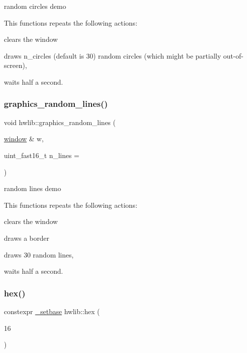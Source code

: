 random circles demo

This functions repeats the following actions\+:
\begin{DoxyItemize}
\item clears the window
\item draws n\+\_\+circles (default is 30) random circles (which might be partially out-\/of-\/screen),
\item waits half a second. 
\end{DoxyItemize}\mbox{\label{namespacehwlib_a6565c83ceab3983476ae71596ddb49a5}} 
\subsubsection{\texorpdfstring{graphics\+\_\+random\+\_\+lines()}{graphics\_random\_lines()}}
{\footnotesize\ttfamily void hwlib\+::graphics\+\_\+random\+\_\+lines (\begin{DoxyParamCaption}\item[{\hyperlink{classhwlib_1_1window}{window} \&}]{w,  }\item[{uint\+\_\+fast16\+\_\+t}]{n\+\_\+lines = {} }\end{DoxyParamCaption})}

random lines demo

This functions repeats the following actions\+:
\begin{DoxyItemize}
\item clears the window
\item draws a border
\item draws 30 random lines,
\item waits half a second. 
\end{DoxyItemize}\mbox{\label{namespacehwlib_a4726c8f4bef5591b6f6853041328a04f}} 
\subsubsection{\texorpdfstring{hex()}{hex()}}
{\footnotesize\ttfamily constexpr \hyperlink{structhwlib_1_1__setbase}{\+\_\+setbase} hwlib\+::hex (\begin{DoxyParamCaption}\item[{16}]{ }\end{DoxyParamCaption})}


